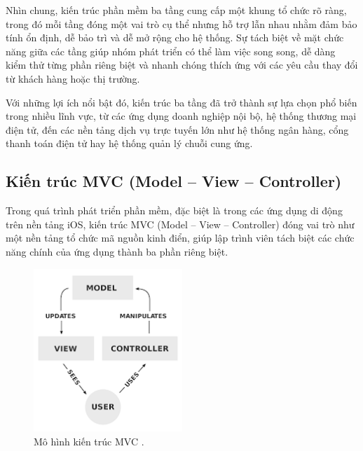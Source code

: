   \begin{flushleft}
  \hspace*{0.8cm}Nhìn chung, kiến trúc phần mềm ba tầng cung cấp một khung tổ chức rõ ràng, trong đó mỗi tầng đóng một vai trò cụ thể nhưng hỗ trợ lẫn nhau nhằm đảm bảo tính ổn định, dễ bảo trì và dễ mở rộng cho hệ thống. Sự tách biệt về mặt chức năng giữa các tầng giúp nhóm phát triển có thể làm việc song song, dễ dàng kiểm thử từng phần riêng biệt và nhanh chóng thích ứng với các yêu cầu thay đổi từ khách hàng hoặc thị trường.
  \end{flushleft}
  
  \begin{flushleft}
  \hspace*{0.8cm}Với những lợi ích nổi bật đó, kiến trúc ba tầng đã trở thành sự lựa chọn phổ biến trong nhiều lĩnh vực, từ các ứng dụng doanh nghiệp nội bộ, hệ thống thương mại điện tử, đến các nền tảng dịch vụ trực tuyến lớn như hệ thống ngân hàng, cổng thanh toán điện tử hay hệ thống quản lý chuỗi cung ứng.
  \end{flushleft}

\subsection{Kiến trúc MVC (Model – View – Controller)}
\renewcommand{\labelitemi}{--}    
    \begin{flushleft}
        \hspace*{0.8cm}Trong quá trình phát triển phần mềm, đặc biệt là trong các ứng dụng di động trên nền tảng iOS, kiến trúc MVC (Model – View – Controller) đóng vai trò như một nền tảng tổ chức mã nguồn kinh điển, giúp lập trình viên tách biệt các chức năng chính của ứng dụng thành ba phần riêng biệt.
    \end{flushleft}

\begin{figure}[H]
  \centering
  \includegraphics[width=0.5\textwidth]{images/mvc.png}
  \caption{Mô hình kiến trúc MVC \cite{daynhauhocMVC}.}
  \label{fig:fig19}
\end{figure}

